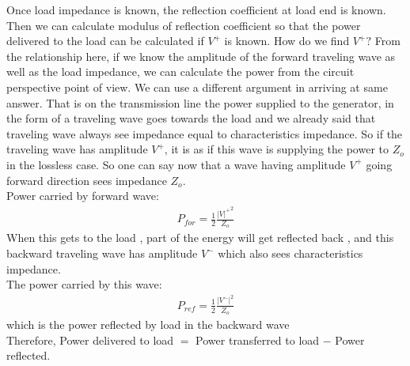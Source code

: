 Once load impedance is known, the reflection coefficient at load end is known. Then we can calculate modulus of reflection coefficient so that the power delivered to the load can be calculated if $V^+$ is known. How do we find $V^+ ? $ From the relationship here, if we know the amplitude of the forward traveling wave as well as the load impedance, we can calculate the power from the circuit perspective point of view. We can use a different argument in arriving at same answer. That is on the transmission line the power supplied to the generator, in the form of a traveling wave goes towards the load and we already said that traveling wave always see impedance equal to characteristics impedance. So if the traveling wave has amplitude $V^+$, it is as if this wave is supplying the power to $Z_o$ in the lossless case. So one can say now that  a wave having amplitude $V^+$ going forward direction sees impedance $Z_o$.\\
Power carried by forward wave:  
\begin{align*}
 P_{for}= \frac{1}{2} \frac{{| V |^+}^2}{Z_o}
\end{align*}
 When this gets to the load , part of the energy will get reflected back , and this backward traveling wave has amplitude $V^-$ which also sees characteristics impedance.\\
 The power carried by this wave:
 \begin{align*}
P_{ref}= \frac{1}{2}\frac{{|V^-|}^2}{Z_o}
 \end{align*}
which is the power reflected by load in the backward wave\\

Therefore, Power delivered to load $=$ Power transferred to load $-$ Power reflected.

